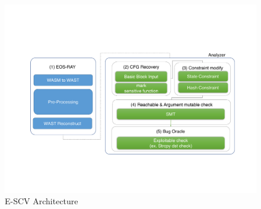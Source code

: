 \begin{figure}[!h] %
  \centering
  \includegraphics[width=\linewidth]{figures/scalableval.pdf}
  \caption{E-SCV Architecture}

\end{figure} 


